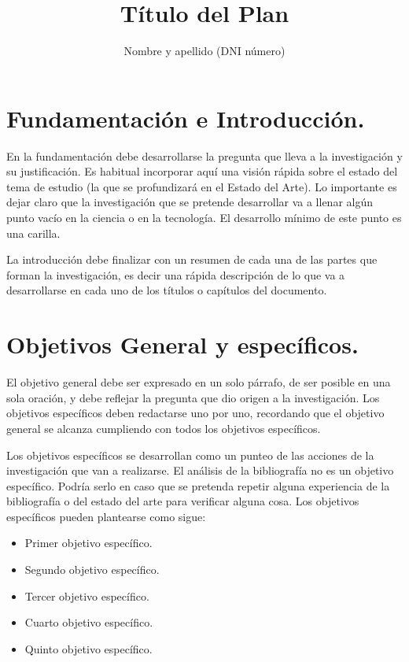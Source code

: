 \documentclass[biblatex]{untref-plan}
\title{Título del Plan}
\author{Nombre y apellido (DNI número)}
\begin{document}
\maketitle

\section{Fundamentación e Introducción.}

En la fundamentación debe desarrollarse la pregunta que lleva a la investigación y su justificación. Es habitual incorporar aquí una visión rápida sobre el estado del tema de estudio (la que se profundizará en el Estado del Arte). Lo importante es dejar claro que la investigación que se pretende desarrollar va a llenar algún punto vacío en la ciencia o en la tecnología. El desarrollo mínimo de este punto es una carilla.

La introducción debe finalizar con un resumen de cada una de las partes que forman la investigación, es decir una rápida descripción de lo que va a desarrollarse en cada uno de los títulos o capítulos del documento.

\section{Objetivos General y específicos.}

El objetivo general debe ser expresado en un solo párrafo, de ser posible en una sola oración, y debe reflejar la pregunta que dio origen a la investigación. Los objetivos específicos deben redactarse uno por uno, recordando que el objetivo general se alcanza cumpliendo con todos los objetivos específicos.

Los objetivos específicos se desarrollan como un punteo de las acciones de la investigación que van a realizarse. El análisis de la bibliografía no es un objetivo específico. Podría serlo en caso que se pretenda repetir alguna experiencia de la bibliografía o del estado del arte para verificar alguna cosa. Los objetivos específicos pueden plantearse como sigue:

\begin{itemize}
  \item Primer objetivo específico.
  \item Segundo objetivo específico.
  \item Tercer objetivo específico.
  \item Cuarto objetivo específico.
  \item Quinto objetivo específico.
\end{itemize}
\end{document}

